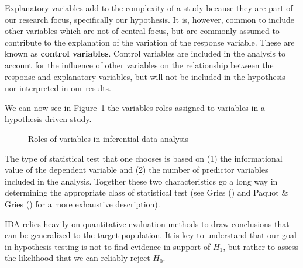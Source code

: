 \documentclass[
  letterpaper,
  krantz1]{latex/krantz-mod}
\theoremstyle{definition}
\theoremstyle{definition}
\theoremstyle{remark}
\begin{document}
Explanatory variables add to the complexity of a study because they are
part of our research focus, specifically our hypothesis. It is, however,
common to include other variables which are not of central focus, but
are commonly assumed to contribute to the explanation of the variation
of the response variable. These are known as \textbf{control
variables}. Control variables are included in
the analysis to account for the influence of other variables on the
relationship between the response and explanatory variables, but will
not be included in the hypothesis nor interpreted in our results.

We can now see in Figure~\ref{fig-analysis-ida-variables} the variables
roles assigned to variables in a hypothesis-driven study.

\begin{figure}[!htb]


\caption{\label{fig-analysis-ida-variables}Roles of variables in
inferential data analysis}

\end{figure}%

The type of statistical test that one chooses is based on (1) the
informational value of the dependent variable
and (2) the number of predictor variables
included in the analysis. Together these two characteristics go a long
way in determining the appropriate class of statistical test (see Gries
() and Paquot \& Gries
() for a more exhaustive description).

IDA relies heavily on quantitative evaluation methods to draw
conclusions that can be generalized to the target population. It is key
to understand that our goal in hypothesis testing is not to find
evidence in support of \(H_1\), but rather
to assess the likelihood that we can reliably reject
\(H_0\).
\end{document}
